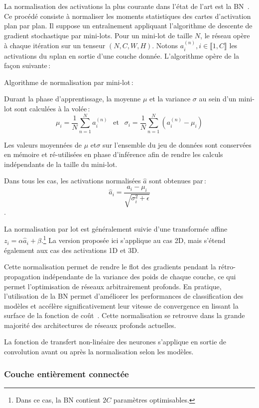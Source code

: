 La normalisation des activations la plus courante dans l'état de l'art est la \gls{BN}~\cite{ioffe_batch_2015}. Ce procédé consiste à normaliser les moments statistiques des cartes d'activation plan par plan. Il suppose un entraînement appliquant l'algorithme de descente de gradient stochastique par mini-lots. Pour un mini-lot de taille $N$, le réseau opère à chaque itération sur un tenseur $(N, C, W, H)$. Notons $a^{(n)}_i, i \in \llbracket 1,C \rrbracket$ les activations du $n$\ieme plan en sortie d'une couche donnée. L'algorithme opère de la façon suivante\,:
\begin{definition}
Algorithme de normalisation par mini-lot\,:

Durant la phase d'apprentissage, la moyenne $\mu$ et la variance $\sigma$ au sein d'un mini-lot sont calculées à la volée\,:
$$\mu_i = \frac{1}{N} \sum_{n=1}^N a_i^{(n)}~~\text{ et }~~\sigma_i = \frac{1}{N} \sum_{n=1}^N (a_i^{(n)} - \mu_i)$$

Les valeurs moyennées de $\mu$ et$\sigma$ sur l'ensemble du jeu de données sont conservées en mémoire et ré-utilisées en phase d'inférence afin de rendre les calculs indépendants de la taille du mini-lot.

Dans tous les cas, les activations normalisées $\hat{a}$ sont obtenues par\,:
$$\hat{a}_i = \frac{a_i - \mu_i}{\sqrt{\sigma_i^2 + \epsilon}}$$.
\end{definition}

La normalisation par lot est généralement suivie d'une transformée affine $z_i = \alpha \hat{a}_i + \beta$.\footnote{Dans ce cas, la \gls{BN} contient $2C$ paramètres optimisables.} La version proposée ici s'applique au cas 2D, mais s'étend également aux cas des activations 1D et 3D.

Cette normalisation permet de rendre le flot des gradients pendant la rétro-propagation indépendante de la variance des poids de chaque couche, ce qui permet l'optimisation de réseaux arbitrairement profonds. En pratique, l'utilisation de la \gls{BN} permet d'améliorer les performances de classification des modèles et accélère significativement leur vitesse de convergence en lissant la surface de la fonction de coût~\cite{santurkar_how_2018}. Cette normalisation se retrouve dans la grande majorité des architectures de réseaux profonds actuelles.

La fonction de transfert non-linéaire des neurones s'applique en sortie de convolution avant ou après la normalisation selon les modèles.

\subsubsection{Couche entièrement connectée}

